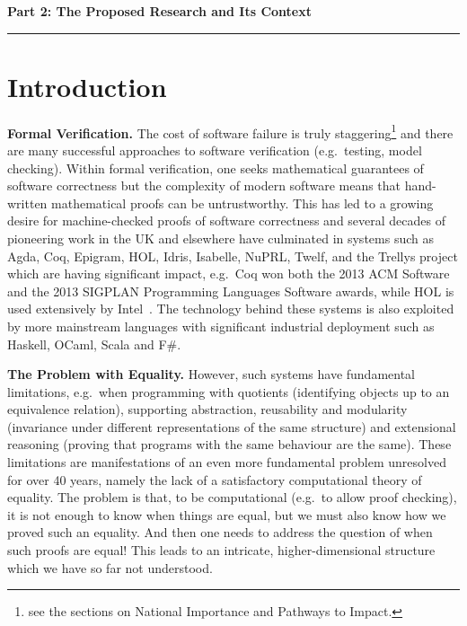 \documentclass[a4paper,11pt]{article}
\newcommand{\eg}{{e.g.}\ }
\begin{document}
\newpage
\noindent
{\bf \Large Part 2: The Proposed Research and Its Context}

\vspace*{-0.23in}

\begin{center}
\rule{170mm}{.5mm}
\end{center}

\vspace*{-0.4in}

\section{Introduction}\label{sec:intro}

\vspace*{-0.1in}

{\bf Formal Verification.} The cost of software failure is truly
staggering\footnote{see the sections on National Importance and
  Pathways to Impact.} and there are many successful approaches to
software verification (\eg testing, model checking). Within formal
verification, one seeks mathematical guarantees of software correctness but
the complexity of modern software means that hand-written mathematical
proofs can be untrustworthy. This has led to a growing desire for
machine-checked proofs of software correctness and several decades of
pioneering work in the UK and elsewhere have culminated in systems
such as Agda, Coq, Epigram, HOL, Idris, Isabelle, NuPRL, Twelf, and
the Trellys project which are having significant impact, \eg Coq won
both the 2013 ACM Software and the 2013 SIGPLAN Programming Languages
Software awards, while HOL is used extensively by
Intel~\cite{harrison:sfm}. The technology behind these systems is also
exploited by more mainstream languages with significant industrial
deployment such as Haskell, OCaml, Scala and F\#.


{\bf The Problem with Equality.} However, such systems have
fundamental limitations, \eg when programming with quotients
(identifying objects up to an equivalence relation), supporting
abstraction, reusability and modularity (invariance under different
representations of the same structure) and extensional reasoning
(proving that programs with the same behaviour are the same). These
limitations are manifestations of an even more fundamental problem
unresolved for over 40 years, namely the lack of a satisfactory
computational theory of equality. The problem is that, to be
computational (\eg to allow proof checking), it is not enough to know
when things are equal, but we must also know how we proved such an
equality. And then one needs to address the question of when such
proofs are equal! This leads to an intricate, higher-dimensional
structure which we have so far not understood.
\end{document}
